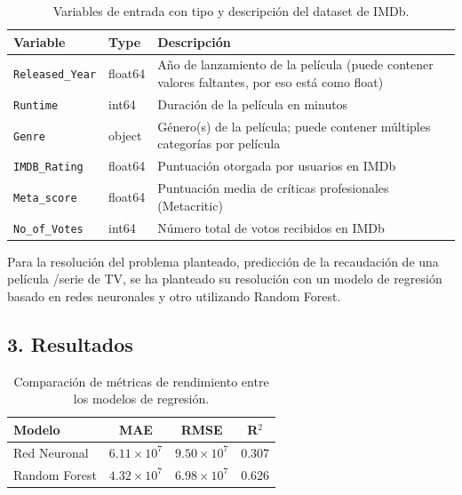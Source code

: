 \documentclass[11pt,a4paper]{article}
\begin{document}
\begin{table}[H]
\centering
\small
{}
\begin{tabular}{p{3.5cm} p{2cm} p{8cm}}
\toprule
\textbf{Variable} & \textbf{Type} & \textbf{Descripción} \\
\midrule

\texttt{Released\_Year} & float64 & Año de lanzamiento de la película (puede contener valores faltantes, por eso está como float) \\

\texttt{Runtime} & int64 & Duración de la película en minutos \\

\texttt{Genre} & object & Género(s) de la película; puede contener múltiples categorías por película \\

\texttt{IMDB\_Rating} & float64 & Puntuación otorgada por usuarios en IMDb \\

\texttt{Meta\_score} & float64 & Puntuación media de críticas profesionales (Metacritic) \\

\texttt{No\_of\_Votes} & int64 & Número total de votos recibidos en IMDb \\

\bottomrule
\end{tabular}
\caption{Variables de entrada con tipo y descripción del dataset de IMDb.}
\label{tab:variables_tipos}
\end{table}

\break

Para la resolución del problema planteado, predicción de la recaudación de una película
/serie de TV, se ha planteado su resolución con un modelo de regresión basado en redes
neuronales y otro utilizando Random Forest.

\subsection*{3. Resultados}

\begin{table}[H]
\centering
\begin{tabular}{lccc}
\toprule
\textbf{Modelo} & \textbf{MAE} & \textbf{RMSE} & \textbf{R$^2$} \\
\midrule

Red Neuronal & $6.11 \times 10^{7}$ & $9.50 \times 10^{7}$ & 0.307 \\
Random Forest & $4.32 \times 10^{7}$ & $6.98 \times 10^{7}$ & 0.626 \\

\bottomrule
\end{tabular}
\caption{Comparación de métricas de rendimiento entre los modelos de regresión.}
\label{tab:modelos}
\end{table}
\end{document}
